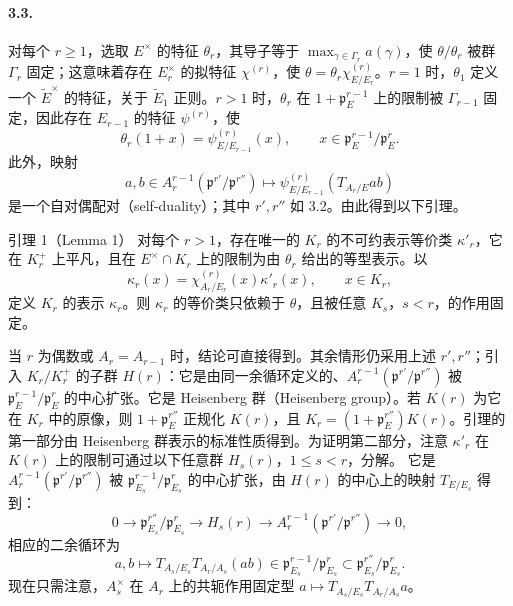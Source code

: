 \paragraph*{3.3.}对每个 $r\geq1$，选取 $E^\times$ 的特征 $\theta_r$，其导子等于 $\max_{\gamma\in\Gamma_r}a(\gamma)$，使 $\theta/\theta_r$ 被群 $\Gamma_r$ 固定；这意味着存在 $E_r^\times$ 的拟特征 $\chi^{(r)}$，使 $\theta=\theta_r\chi_{E/E_r}^{(r)}$。$r=1$ 时，$\theta_1$ 定义一个 $\widetilde E^\times$ 的特征，关于 $\widetilde E_1$ 正则。$r>1$ 时，$\theta_r$ 在 $1+\mathfrak p_E^{r-1}$ 上的限制被 $\Gamma_{r-1}$ 固定，因此存在 $E_{r-1}$ 的特征 $\psi^{(r)}$，使
\[
\theta_r(1+x)=\psi_{E/E_{r-1}}^{(r)}(x),\qquad x\in\mathfrak p_E^{r-1}/\mathfrak p_E^r.
\]
此外，映射
\[
a,b\in A_r^{r-1}(\mathfrak p^{r'}/\mathfrak p^{r''})\longmapsto
\psi_{E/E_{r-1}}^{(r)}(T_{A_r/E}ab)
\]
是一个自对偶配对（self-duality）；其中 $r',r''$ 如 3.2。由此得到以下引理。
\begin{originaltheorem}{引理 1（Lemma 1）}
对每个 $r>1$，存在唯一的 $K_r$ 的不可约表示等价类 $\kappa'_r$，它在 $K_r^+$ 上平凡，且在 $E^\times\cap K_r$ 上的限制为由 $\theta_r$ 给出的等型表示。以
\[
\kappa_r(x)=\chi_{A_r/E_r}^{(r)}(x)\kappa'_r(x),\qquad x\in K_r,
\]
定义 $K_r$ 的表示 $\kappa_r$。则 $\kappa_r$ 的等价类只依赖于 $\theta$，且被任意 $K_s$，$s<r$，的作用固定。
\end{originaltheorem}
当 $r$ 为偶数或 $A_r=A_{r-1}$ 时，结论可直接得到。其余情形仍采用上述 $r',r''$；引入 $K_r/K_r^+$ 的子群 $H(r)$：它是由同一余循环定义的、$A_r^{r-1}(\mathfrak p^{r'}/\mathfrak p^{r''})$ 被 $\mathfrak p_E^{r-1}/\mathfrak p_E^r$ 的中心扩张。它是 Heisenberg 群（Heisenberg group）。若 $K(r)$ 为它在 $K_r$ 中的原像，则 $1+\mathfrak p_E^{r''}$ 正规化 $K(r)$，且 $K_r=(1+\mathfrak p_E^{r''})K(r)$。引理的第一部分由 Heisenberg 群表示的标准性质得到。为证明第二部分，注意 $\kappa'_r$ 在 $K(r)$ 上的限制可通过以下任意群 $H_s(r)$，$1\leq s<r$，分解。
它是 $A_r^{r-1}(\mathfrak p^{r'}/\mathfrak p^{r''})$ 被 $\mathfrak p_{E_s}^{r-1}/\mathfrak p_{E_s}^r$ 的中心扩张，由 $H(r)$ 的中心上的映射 $T_{E/E_s}$ 得到：
\[
0\longrightarrow\mathfrak p_{E_s}^{r''}/\mathfrak p_{E_s}^r\longrightarrow H_s(r)\longrightarrow A_r^{r-1}(\mathfrak p^{r'}/\mathfrak p^{r''})\longrightarrow0,
\]
相应的二余循环为
\[
a,b\longmapsto T_{A_s/E_s}T_{A_r/A_s}(ab)\in\mathfrak p_{E_s}^{r-1}/\mathfrak p_{E_s}^r\subset\mathfrak p_{E_s}^{r''}/\mathfrak p_{E_s}^r.
\]
现在只需注意，$A_s^\times$ 在 $A_r$ 上的共轭作用固定型 $a\mapsto T_{A_s/E_s}T_{A_r/A_s}a$。
